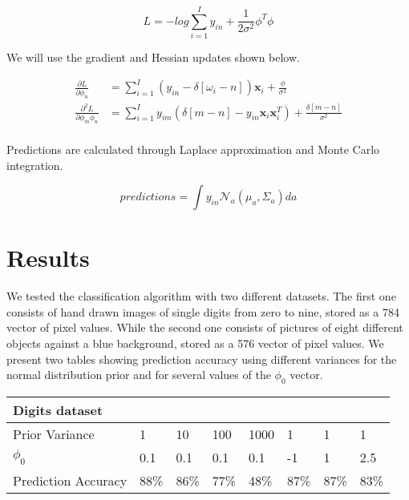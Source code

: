 \documentclass[12pt]{article}
\begin{document}
\begin{equation}
\label{L}
L = - log \sum_{i = 1}^{I} y_{in} + \frac{1}{2 \sigma^{2}} \phi^{T} \phi 
\end{equation}

We will use the gradient and Hessian updates shown below.

\begin{align}
\label{Grad-Hess-Update}
\frac{\partial L}{ \partial \phi_{n}} &= \sum_{i = 1}^{I} \left( y_{in} - \delta \left[ \omega_{i} - n \right] \right) \mathbf{x}_{i}  + \frac{\phi} {\sigma^{2}} \nonumber \\
\frac{\partial^{2} L}{ \partial \phi_{m}\phi_{n}} &= \sum_{i = 1}^{I} y_{im} \left( \delta \left[ m - n \right] - y_{in} \mathbf{x}_{i} \mathbf{x}_{i}^{T}  \right) +  \frac{\delta \left[ m - n \right]}{\sigma^{2}} \nonumber \\
\end{align}

Predictions are calculated through Laplace approximation and Monte Carlo integration.

\begin{equation}
\label{Predictions}
predictions = \int y_{in} \mathcal{N}_{a} \left( \mu_{a}, \Sigma_{a} \right) da
\end{equation}
 
\section{Results}

We tested the classification algorithm with two different datasets.
The first one consists of hand drawn images of single digits from zero to nine, stored as a 784 vector of pixel values.
While the second one consists of pictures of eight different objects against a blue background, stored as a 576 vector of pixel values.
We present two tables showing prediction accuracy using different variances for the normal distribution prior and for several values of the $\phi_{0}$ vector. 

\begin{table}[h]
\begin{tabular}{l|lllllll}
Digits dataset &  &  &  &  &  &  &  \\ \hline
Prior Variance & \multicolumn{1}{l|}{1} & \multicolumn{1}{l|}{10} & \multicolumn{1}{l|}{100} & \multicolumn{1}{l|}{1000} & \multicolumn{1}{l|}{1} & \multicolumn{1}{l|}{1} & \multicolumn{1}{l|}{1} \\ \hline
$\phi_{0}$ & \multicolumn{1}{l|}{0.1} & \multicolumn{1}{l|}{0.1} & \multicolumn{1}{l|}{0.1} & \multicolumn{1}{l|}{0.1} & \multicolumn{1}{l|}{-1} & \multicolumn{1}{l|}{1} & \multicolumn{1}{l|}{2.5} \\ \hline
Prediction Accuracy & \multicolumn{1}{l|}{88\%} & \multicolumn{1}{l|}{86\%} & \multicolumn{1}{l|}{77\%} & \multicolumn{1}{l|}{48\%} & \multicolumn{1}{l|}{87\%} & \multicolumn{1}{l|}{87\%} & \multicolumn{1}{l|}{83\%} \\ \hline
\end{tabular}
\end{table}
\end{document}
